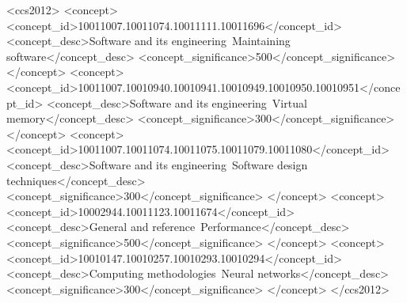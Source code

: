 \begin{CCSXML}
<ccs2012>
   <concept>
       <concept_id>10011007.10011074.10011111.10011696</concept_id>
       <concept_desc>Software and its engineering~Maintaining software</concept_desc>
       <concept_significance>500</concept_significance>
       </concept>
   <concept>
       <concept_id>10011007.10010940.10010941.10010949.10010950.10010951</concept_id>
       <concept_desc>Software and its engineering~Virtual memory</concept_desc>
       <concept_significance>300</concept_significance>
       </concept>
   <concept>
       <concept_id>10011007.10011074.10011075.10011079.10011080</concept_id>
       <concept_desc>Software and its engineering~Software design techniques</concept_desc>
       <concept_significance>300</concept_significance>
       </concept>
   <concept>
       <concept_id>10002944.10011123.10011674</concept_id>
       <concept_desc>General and reference~Performance</concept_desc>
       <concept_significance>500</concept_significance>
       </concept>
   <concept>
       <concept_id>10010147.10010257.10010293.10010294</concept_id>
       <concept_desc>Computing methodologies~Neural networks</concept_desc>
       <concept_significance>300</concept_significance>
       </concept>
 </ccs2012>
\end{CCSXML}




